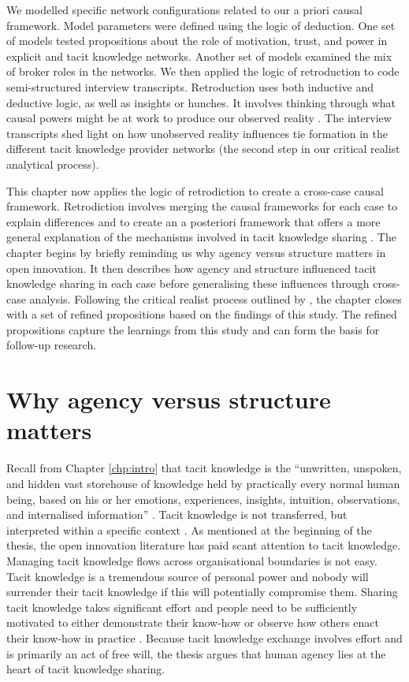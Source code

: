 We modelled specific network configurations related to our a priori causal framework. Model parameters were defined using the logic of deduction. One set of models tested propositions about the role of motivation, trust, and power in explicit and tacit knowledge networks. Another set of models examined the mix of broker roles in the networks. We then applied the logic of retroduction to code semi-structured interview transcripts. Retroduction uses both inductive and deductive logic, as well as insights or hunches. It involves thinking through what causal powers might be at work to produce our observed reality \citep{jagosh2020retroductive}. The interview transcripts shed light on how unobserved reality influences tie formation in the different tacit knowledge provider networks (the second step in our critical realist analytical process). \medskip

This chapter now applies the logic of retrodiction to create a cross-case causal framework. Retrodiction involves merging the causal frameworks for each case to explain differences and to create an a posteriori framework that offers a more general explanation of the mechanisms involved in tacit knowledge sharing \citep{welch2011theorising,mcavoy2018critical}. The chapter begins by briefly reminding us why agency versus structure matters in open innovation. It then describes how agency and structure influenced tacit knowledge sharing in each case before generalising these influences through cross-case analysis. Following the critical realist process outlined by \citet{mcavoy2018critical}, the chapter closes with a set of refined propositions based on the findings of this study. The refined propositions capture the learnings from this study and can form the basis for follow-up research.

\section{Why agency versus structure matters}

Recall from Chapter \ref{chp:intro} that tacit knowledge is the \enquote{unwritten, unspoken, and hidden vast storehouse of knowledge held by practically every normal human being, based on his or her emotions, experiences, insights, intuition, observations, and internalised information} \citep{kreutz2014catalyzing}. Tacit knowledge is not transferred, but interpreted within a specific context \citep{nonaka1994dynamic,duguid2005art,marabelli2014knowing,zhang2020extended}. As mentioned at the beginning of the thesis, the open innovation literature has paid scant attention to tacit knowledge. Managing tacit knowledge flows across organisational boundaries is not easy. Tacit knowledge is a tremendous source of personal power and nobody will surrender their tacit knowledge if this will potentially compromise them. Sharing tacit knowledge takes significant effort and people need to be sufficiently motivated to either demonstrate their know-how or observe how others enact their know-how in practice \citep{gagne2009model}. Because tacit knowledge exchange involves effort and is primarily an act of free will, the thesis argues that human agency lies at the heart of tacit knowledge sharing. \medskip

